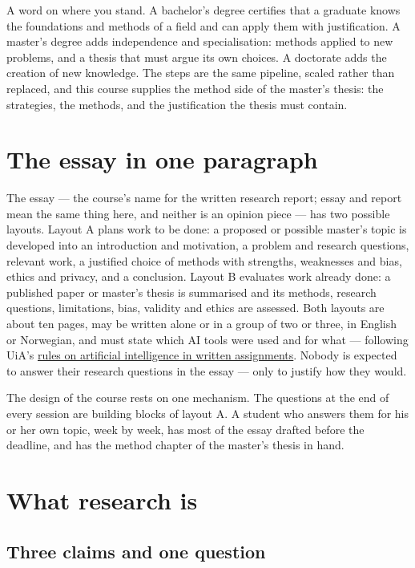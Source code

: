 \documentclass[11pt,a4paper,british,twoside=false,headings=small,chapterprefix=false,numbers=noenddot]{scrbook}
\begin{document}
A word on where you stand. A bachelor's degree certifies that a graduate knows the foundations and methods of a field and can apply them with justification. A master's degree adds independence and specialisation: methods applied to new problems, and a thesis that must argue its own choices. A doctorate adds the creation of new knowledge. The steps are the same pipeline, scaled rather than replaced, and this course supplies the method side of the master's thesis: the strategies, the methods, and the justification the thesis must contain.

\section{The essay in one paragraph}

The essay --- the course's name for the written research report; essay and report mean the same thing here, and neither is an opinion piece --- has two possible layouts. Layout A plans work to be done: a proposed or possible master's topic is developed into an introduction and motivation, a problem and research questions, relevant work, a justified choice of methods with strengths, weaknesses and bias, ethics and privacy, and a conclusion. Layout B evaluates work already done: a published paper or master's thesis is summarised and its methods, research questions, limitations, bias, validity and ethics are assessed. Both layouts are about ten pages, may be written alone or in a group of two or three, in English or Norwegian, and must state which AI tools were used and for what --- following UiA's \href{https://www.uia.no/studier/for-studenter/eksamen/kunstig-intelligens-i-oppgaveskriving.html}{rules on artificial intelligence in written assignments}. Nobody is expected to answer their research questions in the essay --- only to justify how they would.

The design of the course rests on one mechanism. The questions at the end of every session are building blocks of layout A. A student who answers them for his or her own topic, week by week, has most of the essay drafted before the deadline, and has the method chapter of the master's thesis in hand.

\section{What research is}

\subsection{Three claims and one question}
\end{document}
